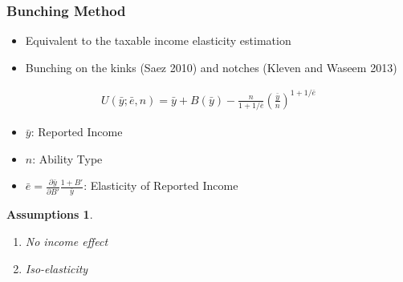 \documentclass[xcolor=pdftex,dvipsnames,table]{beamer}
\newtheorem{assum}{Assumptions}
\begin{document}
\begin{frame}
\frametitle{Bunching Method}
\begin{itemize}
\item Equivalent to the taxable income elasticity estimation
\item Bunching on the kinks (Saez 2010) and notches (Kleven and Waseem 2013)
\end{itemize}
\begin{align*}
U(\bar{y};\bar{e},n)=\bar{y}+B(\bar{y})-\frac{n}{1+1/\bar{e}}\left(\frac{\bar{y}}{n}\right)^{1+1/\bar{e}}
\end{align*}
\begin{itemize}
\item $\bar{y}$: Reported Income
\item $n$: Ability Type
\item $\bar{e}=\frac{\partial \bar{y}}{\partial B'}\frac{1+B'}{\bar{y}}$: Elasticity of Reported Income
\end{itemize}
\begin{assum}
\begin{enumerate}
\item No income effect
\item Iso-elasticity 
\end{enumerate}
\end{assum}
\end{frame}
\end{document}
